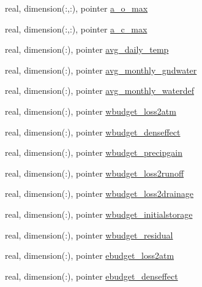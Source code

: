 \begin{DoxyCompactItemize}
\item 
real, dimension(\+:,\+:), pointer \hyperlink{structed__state__vars_1_1sitetype_a588cda3ef4f91be0671e4c457b8b5b0a}{a\+\_\+o\+\_\+max}
\item 
real, dimension(\+:,\+:), pointer \hyperlink{structed__state__vars_1_1sitetype_a0765d713375aea9867c18bdf672d5bf4}{a\+\_\+c\+\_\+max}
\item 
real, dimension(\+:), pointer \hyperlink{structed__state__vars_1_1sitetype_adea63a40388e8f25cce2bcc1380169d0}{avg\+\_\+daily\+\_\+temp}
\item 
real, dimension(\+:), pointer \hyperlink{structed__state__vars_1_1sitetype_acc3bd06ca1ef99aed73b53fd96cedbfa}{avg\+\_\+monthly\+\_\+gndwater}
\item 
real, dimension(\+:), pointer \hyperlink{structed__state__vars_1_1sitetype_a5255b02af7e041b9d92b04b60c28602c}{avg\+\_\+monthly\+\_\+waterdef}
\item 
real, dimension(\+:), pointer \hyperlink{structed__state__vars_1_1sitetype_ad3aa4d4b2d2d915ff8b51d153177c535}{wbudget\+\_\+loss2atm}
\item 
real, dimension(\+:), pointer \hyperlink{structed__state__vars_1_1sitetype_a94b4b82200c6e0030df5bd2c5ba6f3b9}{wbudget\+\_\+denseffect}
\item 
real, dimension(\+:), pointer \hyperlink{structed__state__vars_1_1sitetype_a0cf56e3b084bfd900671a6e8f87291f6}{wbudget\+\_\+precipgain}
\item 
real, dimension(\+:), pointer \hyperlink{structed__state__vars_1_1sitetype_a00959c3c3f80ed831f957ff7c193fea5}{wbudget\+\_\+loss2runoff}
\item 
real, dimension(\+:), pointer \hyperlink{structed__state__vars_1_1sitetype_a4f9ce4e53f88f839f2f50616447ab20f}{wbudget\+\_\+loss2drainage}
\item 
real, dimension(\+:), pointer \hyperlink{structed__state__vars_1_1sitetype_a739bd81416ade6a9c5a36d47f0fd74af}{wbudget\+\_\+initialstorage}
\item 
real, dimension(\+:), pointer \hyperlink{structed__state__vars_1_1sitetype_a1c997416ff8f6ebdf354e617e3f66254}{wbudget\+\_\+residual}
\item 
real, dimension(\+:), pointer \hyperlink{structed__state__vars_1_1sitetype_a04842ee3ed7199f3c9c8d725e11d2d4c}{ebudget\+\_\+loss2atm}
\item 
real, dimension(\+:), pointer \hyperlink{structed__state__vars_1_1sitetype_a6bafdab698e82af6e2306e0c1b8d01c9}{ebudget\+\_\+denseffect}
\item 

\end{DoxyCompactItemize}

